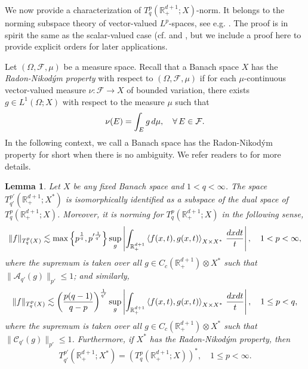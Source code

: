 \documentclass[oneside,english,a4wide]{amsart}
\numberwithin{equation}{section}
\numberwithin{figure}{section}
\theoremstyle{plain}
\theoremstyle{plain}
\theoremstyle{definition}
\theoremstyle{plain}
\newtheorem{lemma}[thm]{Lemma}
\theoremstyle{remark}
\theoremstyle{definition}
\theoremstyle{remark}
\theoremstyle{definition}
\newcommand{\Rmnum}[1]{\uppercase\expandafter{\romannumeral #1}}
\newcommand{\real}{{\mathbb R}}
\newcommand{\F}{{\mathcal F}}
\newcommand{\8}{+\infty}
\renewcommand{\1}{\mathbbm{1}}
\newcommand\jdz[1]{ \left| #1 \right| }
\newcommand\sk[1]{ \left( #1 \right) }
\newcommand\lk[1]{ \left\{ #1 \right\} }
\newcommand{\lara}[1]{\left\langle #1 \right\rangle}
\renewcommand\d{{\rm d}}
\begin{document}
{We now provide a characterization of $T^p_q(\real^{d+1}_+; X)$-norm. It belongs to the norming subspace theory of vector-valued $L^p$-spaces, see e.g. \cite[Chapter \Rmnum{2}, Section 4]{Dinculeanu2014}. The proof is in spirit the same as the scalar-valued case (cf. \cite[Theorem 2.4]{Harboure1991} and \cite[Theorem 1]{Coifman1985}, but we include a proof here to provide explicit orders for later applications.

Let $(\Omega, \F, \mu)$ be a measure space. Recall that a Banach space $X$ has the \emph{Radon-Nikod{\'y}m property} with respect to $(\Omega, \F, \mu)$ if for each $\mu$-continuous vector-valued measure $\nu : \F \to X$ of bounded variation, there exists $g \in L^1(\Omega; X)$ with respect to the measure $\mu$ such that 
\[
    \nu(E) = \int_{E} g \,\d \mu, \quad \forall\, E \in \F.
\]
In the following context, we call a Banach space has the Radon-Nikod{\'y}m property for short when there is no ambiguity. We refer readers to \cite[Chapter \Rmnum{3}]{Diestel1977} for more details.

\begin{lemma}\label{dualtent}
Let $X$ be any fixed Banach space and $1<q<\infty$. The space
    $T^{p'}_{q'}(\real^{d+1}_+; X^*)$ is isomorphically identified as a subspace of the dual space of $T^{p}_{q}(\real^{d+1}_+; X)$. Moreover, it is norming for $T^{p}_{q}(\real^{d+1}_+; X)$ in the following sense, 
    \begin{align}\label{dual1}
        \| f \|_{ T^p_q(X) } \lesssim \max\lk{ p^{\frac{1}{q}}, p'^{\frac{1}{q'}} }\sup_g \jdz{ \int_{\real^{d+1}_+} \lara{ f(x, t), g(x, t) }_{X \times X^*} \,\frac{\d x\d t}{t} }, \quad 1 < p < \infty,
    \end{align}
    where the supremum is taken over all {$g\in C_c(\real^{d+1}_+)\otimes X^*$ such that $\|\mathcal{A}_{q'}(g)\|_{p'} \leq 1$};  and similarly,
    \begin{align}\label{dual2}
        \| f \|_{ T^p_q(X) } \lesssim \sk{\frac{p(q-1)}{q-p}}^{\frac{1}{q'}}\sup_g \jdz{ \int_{\real^{d+1}_+} \lara{ f(x, t), g(x, t) }_{X \times X^*} \,\frac{\d x\d t}{t} }, \quad 1 \leq p < q,
    \end{align}
    where the supremum is taken over all {$g\in C_c(\real^{d+1}_+)\otimes X^*$ such that $\|\mathcal{C}_{q'}(g)\|_{p'} \leq 1$}.
    Furthermore, if $X^*$ has the Radon-Nikod{\'y}m property, then
    \[
        T^{p'}_{q'}(\real^{d+1}_+;X^*) = \sk{ T^{p}_{q}(\real^{d+1}_+;X) }^*, \quad 1\leq p < \infty. 
    \]
\end{lemma}

}
\end{document}
